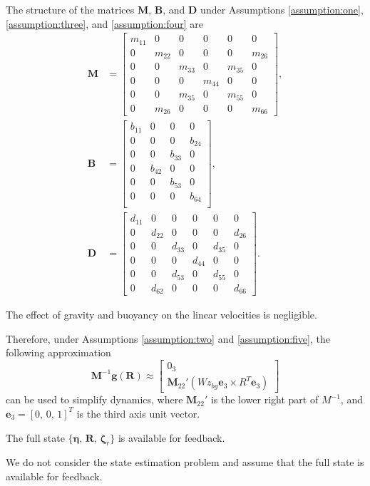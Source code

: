 The structure of the matrices $\mathbf{M}$, $\mathbf{B}$, and $\mathbf{D}$ under Assumptions \ref{assumption:one}, \ref{assumption:three}, and \ref{assumption:four} are
{\allowdisplaybreaks
\begin{subequations}
    \begin{align}
        \mathbf{M} &= \begin{bmatrix}
        m_{11}& 0& 0& 0& 0& 0\\
        0&  m_{22}& 0& 0& 0& m_{26}\\
        0& 0& m_{33}& 0& m_{35}& 0\\
        0& 0& 0& m_{44}& 0& 0\\
        0& 0& m_{35}& 0& m_{55}& 0\\
        0& m_{26}& 0& 0& 0& m_{66}        
        \end{bmatrix},\\
        \mathbf{B} &= \begin{bmatrix}
            b_{11} & 0 & 0 & 0\\
            0 & 0 & 0 & b_{24}\\
            0 & 0 & b_{33} & 0\\
            0 & b_{42} & 0 & 0\\
            0 & 0 & b_{53} & 0\\
            0 & 0 & 0 & b_{64}\\
        \end{bmatrix},\\
        \mathbf{D} &= \begin{bmatrix}
        d_{11}& 0& 0& 0& 0& 0\\
        0& d_{22}& 0& 0& 0& d_{26}\\
        0& 0& d_{33}& 0& d_{35}& 0\\
        0& 0& 0& d_{44}& 0& 0\\
        0& 0& d_{53}& 0& d_{55}& 0\\
        0& d_{62}& 0& 0& 0& d_{66}        
        \end{bmatrix}.
    \end{align}
\end{subequations}
}
\begin{assumption}\label{assumption:five}
    The effect of gravity and buoyancy on the linear velocities is negligible. 
\end{assumption}

Therefore, under Assumptions \ref{assumption:two} and \ref{assumption:five}, the following approximation 
    \begin{equation}
        \mathbf{M}^{-1}\mathbf{g}(\mathbf{R}) \approx \begin{bmatrix}
            0_3\\
            \mathbf{M}_{22}'(W z_{bg}\mathbf{e}_3\times R^T \mathbf{e}_3)
        \end{bmatrix}
    \end{equation}
can be used to simplify dynamics, where $\mathbf{M}_{22}'$ is the lower right part of $M^{-1}$, and $\mathbf{e}_3 = [0, \, 0,\, 1]^T$ is the third axis unit vector. 

\begin{assumption}
    The full state $\{\bm{\eta},\, \mathbf{R},\, \bm{\zeta}_r\}$ is available for feedback. 
\end{assumption}
We do not consider the state estimation problem and assume that the full state is available for feedback.